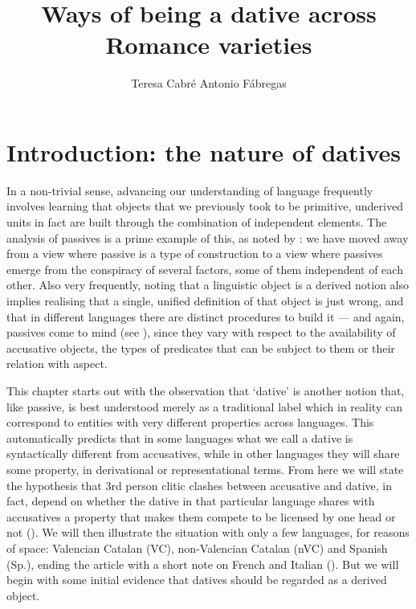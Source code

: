 \documentclass[output=paper,modfonts,nonflat,newtxmath,colorlinks,citecolor=brown]{langsci/langscibook}
\author{Teresa Cabré\affiliation{CLT-Universitat Autònoma de Barcelona}\lastand
Antonio Fábregas\affiliation{University of Tromsø-Norway’s Arctic University}}
\title{Ways of being a dative across Romance varieties}
\begin{document}
\maketitle

\section{Introduction: the nature of datives} %
\label{sec:cabre:1}

In a non-trivial sense, advancing our understanding of language frequently involves learning that objects that we previously took to be primitive, underived units in fact are built through the combination of independent elements. The analysis of passives is a prime example of this, as noted by \citet{Williams2015}: we have moved away from a view where passive is a type of construction to a view where passives emerge from the conspiracy of several factors, some of them independent of each other. Also very frequently, noting that a linguistic object is a derived notion also implies realising that a single, unified definition of that object is just wrong, and that in different languages there are distinct procedures to build it — and again, passives come to mind (see \citealt{Croft2017}), since they vary with respect to the availability of accusative objects, the types of predicates that can be subject to them or their relation with aspect.

This chapter starts out with the observation that ‘dative’ is another notion that, like passive, is best understood merely as a traditional label which in reality can correspond to entities with very different properties across languages. This automatically predicts that in some languages what we call a dative is syntactically different from accusatives, while in other languages they will share some property, in derivational or representational terms. From here we will state the hypothesis that 3rd person clitic clashes between accusative and dative, in fact, depend on whether the dative in that particular language shares with accusatives a property that makes them compete to be licensed by one head or not (). We will then illustrate the situation with only a few languages, for reasons of space: Valencian Catalan (VC), non-Valencian Catalan (nVC) and Spanish (Sp.), ending the article with a short note on French and Italian (). But we will begin with some initial evidence that datives should be regarded as a derived object.
\end{document}
